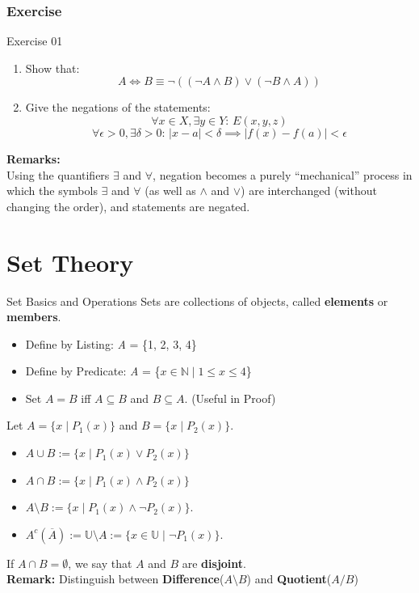 \documentclass[dvipsnames]{beamer}
\theoremstyle{plain}
\theoremstyle{definition}
\begin{document}
\begin{frame}[t]
\frametitle{Exercise}

\begin{block}{Exercise 01}
    \begin{enumerate}
        \item Show that: $$A \Leftrightarrow  B \equiv \lnot((\lnot A \land B) \lor (\lnot B \land A)) $$
        \item Give the negations of the statements: $$ \forall x \in X, \exists y \in Y:\, E(x,y,z)$$
        $$\forall \epsilon > 0, \exists \delta > 0:\, |x - a| < \delta \implies |f(x) - f(a)| < \epsilon$$
    \end{enumerate}
\end{block}
\textbf{Remarks:}\\
Using the quantifiers $\exists$ and $\forall$, negation becomes a purely “mechanical” process in which the symbols $\exists$ and $\forall$ (as well as $\wedge$ and $\vee$) are interchanged (without changing the order), and statements are negated.
\end{frame}

\section{Set Theory}

\begin{frame}{Set Basics and Operations}
    Sets are collections of objects, called \textbf{elements} or \textbf{members}.
    \begin{itemize}
    \item Define by Listing: \textit{A} = \{1, 2, 3, 4\}
    \item Define by Predicate: \textit{A} = \{$x \in \mathbb{N} \mid 1 \leq x \leq 4$\}
    \item Set $A = B$ iff $A\subseteq B$ and $B \subseteq A$. (Useful in Proof)
    \end{itemize}
\vspace{0.5em}
Let \(A = \{x \mid P_1(x)\}\) and \(B = \{x \mid P_2(x)\}\).  
\begin{itemize}
\item {} $A \cup B := \{x \mid P_1(x) \lor P_2(x)\}$
\item {} $A \cap B := \{x \mid P_1(x) \land P_2(x)\}$
\item {} $A \setminus B := \{x \mid P_1(x) \land \lnot P_2(x)\}$.
\item {} $A^c (\overline{A}) := \mathbb{U} \setminus A := \{x \in \mathbb{U} \mid \lnot P_1(x)\}$.
\end{itemize}
If \(A \cap B = \emptyset\), we say that \(A\) and \(B\) are \textbf{disjoint}.  \\
\vspace{0.5em}
\textbf{Remark:} Distinguish between \textbf{Difference}(\(A \setminus B\)) and \textbf{Quotient}(\(A / B\))    
\end{frame}
\end{document}
